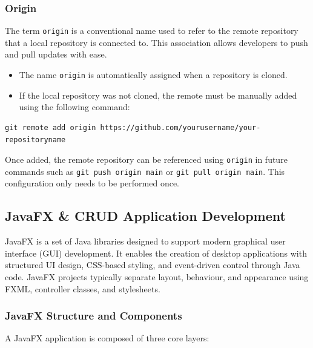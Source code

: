 \documentclass{article}
\newcommand{\codecmd}[1]{\textcolor[rgb]{0,0.5,0}{\texttt{#1}}}
\begin{document}
\subsubsection{Origin}

The term \codecmd{origin} is a conventional name used to refer to the remote repository that a local repository is connected to. This association allows developers to push and pull updates with ease.

\begin{itemize}
    \item The name \codecmd{origin} is automatically assigned when a repository is cloned.
    \item If the local repository was not cloned, the remote must be manually added using the following command:
\end{itemize}

\begin{tcolorbox}[colback=mintgreen, colframe=green!40!black, boxrule=0.5pt, sharp corners]
\begin{verbatim}
git remote add origin https://github.com/yourusername/your-repositoryname
\end{verbatim}
\end{tcolorbox}

\noindent Once added, the remote repository can be referenced using \codecmd{origin} in future commands such as \codecmd{git push origin main} or \codecmd{git pull origin main}. This configuration only needs to be performed once.

\subsection{JavaFX \& CRUD Application Development}

JavaFX is a set of Java libraries designed to support modern graphical user interface (GUI) development. It enables the creation of desktop applications with structured UI design, CSS-based styling, and event-driven control through Java code. JavaFX projects typically separate layout, behaviour, and appearance using FXML, controller classes, and stylesheets.

\subsubsection{JavaFX Structure and Components}

A JavaFX application is composed of three core layers:
\end{document}
